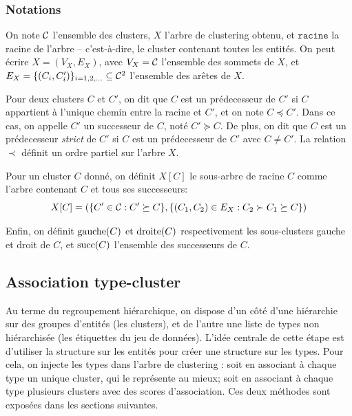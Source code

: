 

\subsubsection{Notations}

On note $\mathcal{C}$ l'ensemble des clusters, $X$ l'arbre de clustering obtenu, et $\texttt{racine}$ la racine de l'arbre – c'est-à-dire, le cluster contenant toutes les entités. On peut écrire $X = (V_X, E_X)$, avec $V_X = \mathcal{C}$ l'ensemble des sommets de $X$, et $E_X = \{(C_i, C_i')\}_{i = 1, 2, \ldots } \subseteq \mathcal{C}^2$ l'ensemble des arêtes de $X$.

Pour deux clusters $C$ et $C'$, on dit que $C$ est un prédecesseur de $C'$ si $C$ appartient à l'unique chemin entre la racine et $C'$, et on note $C \preceq C'$. Dans ce cas, on appelle $C'$ un successeur de $C$, noté $C' \succeq C$. De plus, on dit que $C$ est un prédecesseur \textit{strict} de $C'$ si $C$ est un prédecesseur de $C'$ avec $C \neq C'$. La relation $\prec$ définit un ordre partiel sur l'arbre $X$.

Pour un cluster $C$ donné, on définit $X[C]$ le sous-arbre de racine $C$ comme l'arbre contenant $C$ et tous ses successeurs:
\begin{equation}
    X[C] = (\{C' \in \mathcal{C} : C' \succeq C\}, \{(C_1, C_2) \in E_X : C_2 \succ C_1 \succeq C\})
\end{equation}

Enfin, on définit $\operatorname{gauche}(C)$ et $\operatorname{droite}(C)$ respectivement les sous-clusters gauche et droit de $C$, et $\operatorname{succ}(C)$ l'ensemble des successeurs de $C$.

\subsection{Association type-cluster}
\label{subsec:te-mapping}


Au terme du regroupement hiérarchique, on dispose d'un côté d'une hiérarchie sur des groupes d'entités (les clusters), et de l'autre une liste de types non hiérarchisée (les étiquettes du jeu de données). L'idée centrale de cette étape est d'utiliser la structure sur les entités pour créer une structure sur les types. Pour cela, on injecte les types dans l'arbre de clustering : soit en associant à chaque type un unique cluster, qui le représente au mieux; soit en associant à chaque type plusieurs clusters avec des scores d'association. Ces deux méthodes sont exposées dans les sections suivantes.


